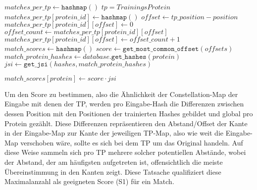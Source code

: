 \begin{enumerate}[a)]
\begin{minipage}{\Width}
\begin{algorithm}[H]
\begin{algorithmic}[1]
                            \State $matches\_per\_tp \gets \texttt{hashmap}()$ \Comment $tp=Trainings Protein$
                                            \State $matches\_per\_tp[protein\_id] \gets \texttt{hashmap}()$
                                        \EndIf
                                        \State $offset \gets tp\_position - position$
                                            \State $matches\_per\_tp[protein\_id][offset] \gets 0$
                                        \EndIf
                                        \State $offset\_count \gets matches\_per\_tp[protein\_id][offset]$
                                        \State $matches\_per\_tp[protein\_id][offset] \gets offset\_count + 1$
                                    \EndFor
                                \EndIf
                            \EndFor
                            \State $match\_scores \gets \texttt{hashmap}()$
                                \State $score \gets \texttt{get\_most\_common\_offset}(offsets)$
                                \State $match\_protein\_hashes \gets database.\texttt{get\_hashes}(protein)$
                                \State $jsi \gets \texttt{get\_jsi}(hashes, match\_protein\_hashes)$

                                \State $match\_scores[protein] \gets score \cdot jsi$
                            \EndFor
                        \end{algorithmic}
                    \end{algorithm}
                \end{minipage}

                Um den Score zu bestimmen, also die Ähnlichkeit der Constellation-Map der Eingabe mit denen der \ac{TP}, werden pro Eingabe-Hash die Differenzen zwischen dessen Position mit den Positionen der trainierten Hashes gebildet und global pro Protein gezählt. Diese Differenzen repräsentieren den Abstand/Offset der Kante in der Eingabe-Map zur Kante der jeweiligen \ac{TP}-Map, also wie weit die Eingabe-Map verschoben wäre, sollte es sich bei dem \ac{TP} um das Original handeln. Auf diese Weise sammeln sich pro \ac{TP} mehrere solcher potentiellen Abstände, wobei der Abstand, der am häufigsten aufgetreten ist, offensichtlich die meiste Übereinstimmung in den Kanten zeigt. Diese Tatsache qualifiziert diese Maximalanzahl als geeigneten Score (S1) für ein Match.


\end{enumerate}
